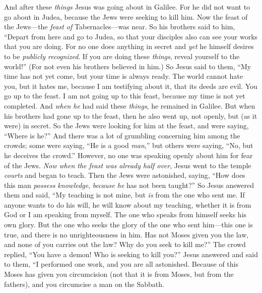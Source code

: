 \begin{biblechapter} %
 And after these \textit{things} Jesus was going about in Galilee. For he did not want to go about in Judea, because the Jews were seeking to kill him.
\verse Now the feast of the Jews—the \textit{feast of} Tabernacles—was near.
\verse So his brothers said to him, “Depart from here and go to Judea, so that your disciples also can see your works that you are doing.
\verse For no one does anything in secret and \textit{yet} he himself desires to be \textit{publicly recognized}. If you are doing these \textit{things}, reveal yourself to the world!”
\verse (For not even his brothers believed in him.)
 So Jesus said to them, “My time has not yet come, but your time is always ready.
\verse The world cannot hate you, but it hates me, because I am testifying about it, that its deeds are evil.
\verse You go up to the feast. I am not going up to this feast, because my time is not yet completed.
\verse And \textit{when he} had said these \textit{things}, he remained in Galilee.
\verse But when his brothers had gone up to the feast, then he also went up, not openly, but (as it were) in secret.
\verse So the Jews were looking for him at the feast, and were saying, “Where is he?”
\verse And there was a lot of grumbling concerning him among the crowds; some were saying, “He is a good \textit{man},” but others were saying, “No, but he deceives the crowd.”
\verse However, no one was speaking openly about him for fear of the Jews.
\verse \textit{Now when the feast was already half over}, Jesus went to the temple \textit{courts} and began to teach.
\verse Then the Jews were astonished, saying, “How does this man \textit{possess knowledge}, \textit{because he} has not been taught?”
\verse So Jesus answered them and said, “My teaching is not mine, but \textit{is} from the one who sent me.
\verse If anyone wants to do his will, he will know about my teaching, whether it is from God or I am speaking from myself.
\verse The one who speaks from himself seeks his own glory. But the one who seeks the glory of the one who sent him—this one is true, and there is no unrighteousness in him.
\verse Has not Moses given you the law, and none of you carries out the law? Why do you seek to kill me?”
\verse The crowd replied, “You have a demon! Who is seeking to kill you?”
\verse Jesus answered and said to them, “I performed one work, and you are all astonished.
\verse Because of this Moses has given you circumcision (not that it is from Moses, but from the fathers), and you circumcise a man on the Sabbath.

\end{biblechapter}
